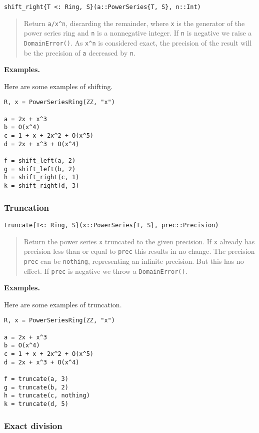 \documentclass[a4paper,10pt]{article}
\newcommand{\code}{\lstinline}
\newcommand{\desc}[1]{\vspace{-3mm}\begin{quote}#1\end{quote}}
\begin{document}
{{\begin{lstlisting}
shift_right{T <: Ring, S}(a::PowerSeries{T, S}, n::Int)
\end{lstlisting}

\desc{Return \code{a/x^n}, discarding the remainder, where \code{x} is the
generator of the power series ring and \code{n} is a nonnegative integer. If 
\code{n} is negative we raise a \code{DomainError()}. As \code{x^n} is
considered exact, the precision of the result will be the precision of \code{a}
decreased by \code{n}.}

\textbf{Examples.}

Here are some examples of shifting.

\begin{lstlisting}
R, x = PowerSeriesRing(ZZ, "x")

a = 2x + x^3
b = O(x^4)
c = 1 + x + 2x^2 + O(x^5)
d = 2x + x^3 + O(x^4)

f = shift_left(a, 2)
g = shift_left(b, 2)
h = shift_right(c, 1)
k = shift_right(d, 3)
\end{lstlisting}

\subsubsection{Truncation}

\begin{lstlisting}
truncate{T<: Ring, S}(x::PowerSeries{T, S}, prec::Precision)
\end{lstlisting}

\desc{Return the power series \code{x} truncated to the given precision. If
\code{x} already has precision less than or equal to \code{prec} this results
in no change. The precision \code{prec} can be \code{nothing}, representing
an infinite precision. But this has no effect. If \code{prec} is negative we
throw a \code{DomainError()}.}

\textbf{Examples.}

Here are some examples of truncation.

\begin{lstlisting}
R, x = PowerSeriesRing(ZZ, "x")

a = 2x + x^3
b = O(x^4)
c = 1 + x + 2x^2 + O(x^5)
d = 2x + x^3 + O(x^4)

f = truncate(a, 3)
g = truncate(b, 2)
h = truncate(c, nothing)
k = truncate(d, 5)
\end{lstlisting}

\subsubsection{Exact division}

}}
\end{document}
